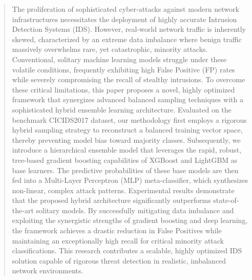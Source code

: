 \begin{abstract}
The proliferation of sophisticated cyber-attacks against modern network infrastructures necessitates the deployment of highly accurate Intrusion Detection Systems (IDS). However, real-world network traffic is inherently skewed, characterized by an extreme data imbalance where benign traffic massively overwhelms rare, yet catastrophic, minority attacks. Conventional, solitary machine learning models struggle under these volatile conditions, frequently exhibiting high False Positive (FP) rates while severely compromising the recall of stealthy intrusions. To overcome these critical limitations, this paper proposes a novel, highly optimized framework that synergizes advanced balanced sampling techniques with a sophisticated hybrid ensemble learning architecture. Evaluated on the benchmark CICIDS2017 dataset, our methodology first employs a rigorous hybrid sampling strategy to reconstruct a balanced training vector space, thereby preventing model bias toward majority classes. Subsequently, we introduce a hierarchical ensemble model that leverages the rapid, robust, tree-based gradient boosting capabilities of XGBoost and LightGBM as base learners. The predictive probabilities of these base models are then fed into a Multi-Layer Perceptron (MLP) meta-classifier, which synthesizes non-linear, complex attack patterns. Experimental results demonstrate that the proposed hybrid architecture significantly outperforms state-of-the-art solitary models. By successfully mitigating data imbalance and exploiting the synergistic strengths of gradient boosting and deep learning, the framework achieves a drastic reduction in False Positives while maintaining an exceptionally high recall for critical minority attack classifications. This research contributes a scalable, highly optimized IDS solution capable of rigorous threat detection in realistic, imbalanced network environments.
\end{abstract}
